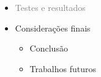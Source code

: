\documentclass[10pt]{beamer}
\begin{document}
\begin{frame}
\begin{itemize}
    
    \item[\color{gray}{$\bullet$}] \textcolor{gray}{Testes e resultados}

   
    \item Considerações finais
    \begin{itemize}
      \item[\ ] Conclusão
      \item[\ ] Trabalhos futuros
    \end{itemize}

  \end{itemize}

\end{frame}
\end{document}
